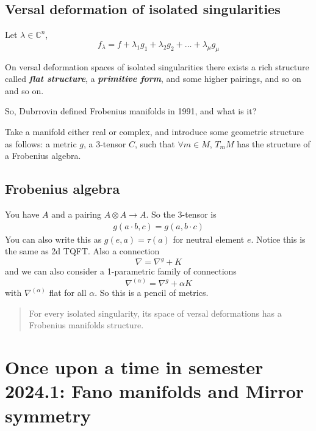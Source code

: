 \subsection{Versal deformation of isolated singularities}
Let $\lambda\in\mathbb{C}^n$,
\[f_\lambda = f+\lambda_1g_1+\lambda_2g_2+\ldots+\lambda_\mu g_\mu\]

\begin{thm}[Saito]
	On versal deformation spaces of isolated singularities there exists a rich structure called \textbf{\textit{flat structure}}, a \textbf{\textit{primitive form}}, and some higher pairings, and so on and so on.
\end{thm}

So, Dubrrovin defined Frobenius manifolds in 1991, and what is it?
\begin{defn}
	Take a manifold either real or complex, and introduce some geometric structure as follows: a metric $g$, a $3$-tensor $C$, such that $\forall m\in M$, $T_mM$ has the structure of a Frobenius algebra.
\end{defn}

\subsection{Frobenius algebra}
You have $A$ and a pairing $A\otimes A\to A$. So the 3-tensor is
\begin{align*}
	g(a\cdot b,c)=g(a,b\cdot c)
\end{align*}
You can also write this as $g(e,a)=\tau(a)$ for neutral element $e$. Notice this is the same as 2d TQFT. Also a connection
\[\nabla =\nabla^g+K\]
and we can also consider a 1-parametric family of connections
\[\nabla^{(\alpha)} =\nabla^g+\alpha K\]
with $\nabla^{(\alpha)}$ flat for all $\alpha$. So this is a pencil of metrics.

\begin{quotation}
	For every isolated singularity, its space of versal deformations has a Frobenius manifolds structure.
\end{quotation}
\section{Once upon a time in semester 2024.1: Fano manifolds and Mirror symmetry}


